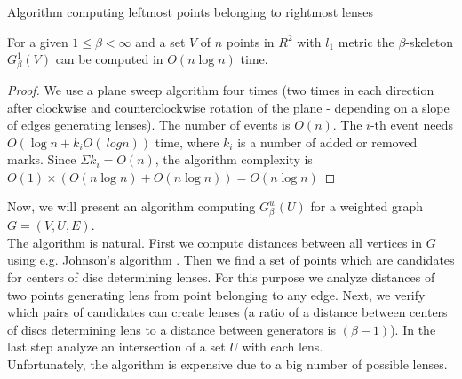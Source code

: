 \documentclass[11pt]{llncs}
\begin{document}
  
\begin{algorithm}[H]
\footnotesize{
\BlankLine

}
\caption{Algorithm computing leftmost points belonging to rightmost lenses}
\label{alg-2}   
\end{algorithm}   

\begin{theorem}
For a given $1 \leq \beta < \infty$ and a set $V$ of $n$ points in $R^2$ with $l_1$ metric 
the $\beta$-skeleton $G_{\beta}^1(V)$ can be computed in $O(n \log n)$ time.
\end{theorem}
\begin{proof}
We use a plane sweep algorithm four times (two times in each direction after clockwise 
and counterclockwise rotation of the plane - depending on a slope of edges generating lenses).
The number of events is $O(n)$. The $i$-th event needs $O(\log n + k_iO(\ log n))$ time, where 
$k_i$ is a number of added or removed marks. Since $\Sigma k_i = O(n)$, the algorithm complexity is 
$O(1) \times (O(n \log n) +O(n \log n)) = O(n \log n)$
\end{proof}



Now, we will present an algorithm computing $G_{\beta}^w(U)$ for a weighted graph $G=(V,U,E)$.\\
The algorithm is natural. First we compute distances between all vertices in $G$ using 
e.g. Johnson's algorithm \cite{clrs09}. Then we find a set of points which are candidates for centers
of disc determining lenses. For this purpose we analyze distances of two points generating lens
from point belonging to any edge. Next, we verify which pairs of candidates can create lenses
(a ratio of a distance between centers of discs determining lens to a distance between generators
is $(\beta-1)$). In the last step analyze an intersection of a set $U$ with each lens. \\
Unfortunately, the algorithm is expensive due to a big number of possible lenses.
\end{document}

